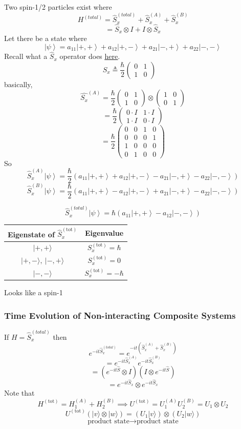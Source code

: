 \documentclass[
]{article}
\let\oldhyperref\hyperref
\renewcommand{\hyperref}[2][]{\oldhyperref[#1]{\underline{#2}}}
\providecommand{\ket}[1]{\left\lvert #1 \right\rangle}
\begin{document}
Two spin-1/2 particles exist where
\[
	H^{(total)}=\hat{S}^{(total)}_x+ \hat{S}^{(A)}_x + \hat{S}^{(B)}_x
\]
\[
	=\hat{S}_x\otimes I + I \otimes \hat{S}_x
\]
Let there be a state where
\[
	\ket{\psi}=a_{11}\ket{+,+}+a_{12}\ket{+,-}+a_{21}\ket{-,+}+a_{22}\ket{-,-}
\]
Recall what a $\hat{S}_x$ operator does \hyperref[spin-12-systems]{here}.
\[
	S_x\triangleq\frac{\hbar}{2}\begin{pmatrix}0 & 1\\ 1 & 0\end{pmatrix}\quad
\]
basically,
\[
	\hat{S_x}^{(A)}=\frac{\hbar}{2}\begin{pmatrix}0 & 1\\ 1 & 0\end{pmatrix}\otimes \begin{pmatrix}1 & 0\\ 0 & 1\end{pmatrix}
\]
\[
	= \frac{\hbar}{2}\begin{pmatrix} 0 \cdot I & 1 \cdot I \\ 1 \cdot I & 0 \cdot I \end{pmatrix}
\]
\[
	= \frac{\hbar}{2}\begin{pmatrix} 0 & 0 & 1 & 0 \\ 0 & 0 & 0 & 1 \\ 1 & 0 & 0 & 0 \\ 0 & 1 & 0 & 0 \end{pmatrix}
\]
So
\[
	\hat{S}_x^{(A)}\ket{\psi}=\frac{\hbar}{2}(a_{11}\ket{+,+}+a_{12}\ket{+,-}-a_{21}\ket{-,+}-a_{22}\ket{-,-})
\]
\[
	\hat{S}_x^{(B)}\ket{\psi}=\frac{\hbar}{2}(a_{11}\ket{+,+}-a_{12}\ket{+,-}+a_{21}\ket{-,+}-a_{22}\ket{-,-})
\]

\[
	\hat{S}_x^{(total)}\ket{\psi}=\hbar(a_{11}\ket{+,+}-a_{12}\ket{-,-})
\]
\begin{tabular}{|c|c|}
	\hline
	Eigenstate of $\hat{S}_x^{(\text{tot})}$ & Eigenvalue                    \\
	\hline
	$|+,+\rangle$                            & $S_x^{(\text{tot})} = \hbar$  \\
	$|+,-\rangle, \ |-,+\rangle$             & $S_x^{(\text{tot})} = 0$      \\
	$|-,-\rangle$                            & $S_x^{(\text{tot})} = -\hbar$ \\
	\hline
\end{tabular}
Looks like a spin-1
\subsubsection{Time Evolution of Non-interacting Composite Systems}\label{time-evolution-of-non-interacting-composite-systems}
If $H=\hat{S}_x^{(total)}$ then
\[
	e^{-it\hat{S}_x^{(total)}}=e^{-it\left(\hat{S}_x^{(A)}+\hat{S}_x^{(B)}\right)}
\]
\[
	=e^{-it\hat{S}_x^{(A)}}e^{-it\hat{S}_x^{(B)}}
\]
\[
	=(e^{-it\hat{S}}\otimes I)(I \otimes e^{-it\hat{S}})
\]
\[
	=e^{-it\hat{S}_x}\otimes e^{-it\hat{S}_x}
\]
Note that
\[
	H^{(\text{tot})} = H_1^{(A)} + H_2^{(B)} \implies U^{(\text{tot})} = U_1^{(A)} U_2^{(B)} = U_1 \otimes U_2
\]
\[
	U^{(\text{tot})}(|v\rangle \otimes |w\rangle) = (U_1 |v\rangle) \otimes (U_2 |w\rangle)
\]
\[
	\text{product state} \longrightarrow \text{product state}
\]
\end{document}
